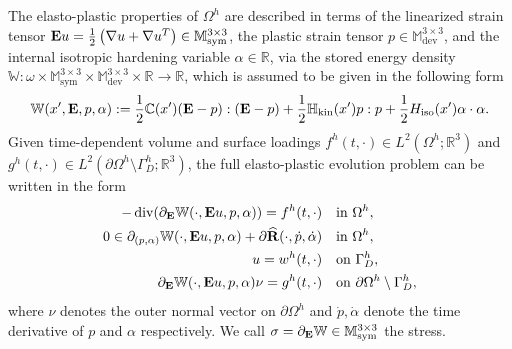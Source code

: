 \documentclass[reqno,10pt]{amsart}
\numberwithin{equation}{section}
\theoremstyle{remark}
\newcommand{\C}{\mathbb{C}}
\newcommand{\M}{\mathbb{M}}
\newcommand{\R}{\mathbb{R}}
\newcommand{\W}{{\mathbb{W}}}
\DeclareMathOperator{\dev}{dev}
\DeclareMathOperator{\sym}{sym}
\renewcommand{\div}{\operatorname{div}}
\newcommand{\fvol}{f}
\newcommand{\fsurf}{g}
\newcommand{\Dir}{D}
\newcommand{\E}{{\bf E}}
\newcommand{\Hkin}{\mathbb{H}_{\rm kin}}
\newcommand{\Hiso}{H_{\rm iso}}
\newcommand{\disspot}{\mathbf{R}}
\newcommand{\gendisspot}{\widehat{\disspot}}
\begin{document}
The elasto-plastic properties of $\Omega^h$ are described in terms of the linearized strain tensor ${\E}u = \frac{1}{2}\left(\nabla u+\nabla u^T\right) \in \M^{3 \times 3}_{\sym}$, the plastic strain tensor $p \in \M^{3 \times 3}_{\dev}$,
and the internal isotropic hardening variable $\alpha \in \R$, via the stored energy density $\W : \omega \times \M^{3 \times 3}_{\sym} \times \M^{3 \times 3}_{\dev} \times \R \to \R$, which is assumed to be given in the following form
\begin{equation} \label{stored energy density}
	\W(x', {\E}, p, \alpha) := 
	\frac{1}{2}\C(x')({\E}-p):({\E}-p) 
	+ \frac{1}{2}\Hkin(x')p:p + \frac{1}{2}\Hiso(x')\alpha\cdot\alpha.
\end{equation}
Given time-dependent volume and surface loadings $\fvol^h(t,\cdot)\in L^2(\Omega^h;\R^3)$ and $\fsurf^h(t,\cdot)\in L^2(\partial\Omega^h\setminus \Gamma_\Dir^h;\R^3)$, the full elasto-plastic evolution problem can be written in the form
\begin{equation} \label{system of elastoplastic equations on the thin plate}
\begin{split}
	-\div(\partial_{{\E}}\W(\cdot, {\E}u, p, \alpha)) = \fvol^h(t,\cdot) \quad & \text{in}\,\,\Omega^h,\\
	0 \in \partial_{(p, \alpha)}\W(\cdot, {\E}u, p, \alpha) + \partial \gendisspot(\cdot, \dot{p}, \dot{\alpha}) \quad & \text{in}\,\,\Omega^h,\\
	u = w^h(t,\cdot) \quad & \text{on}\,\, \Gamma_\Dir^h,\\
	\partial_{{\E}}\W(\cdot, {\E}u, p, \alpha) \nu = \fsurf^h(t,\cdot) \quad & \text{on}\,\,\partial\Omega^h\setminus \Gamma_\Dir^h,
\end{split}
\end{equation}
where $\nu$ denotes the outer normal vector on $\partial\Omega^h$ and $\dot{p}, \dot{\alpha}$ denote the time derivative of $p$ and $\alpha$ respectively.
We call $\sigma = \partial_{{\E}}\W \in \M^{3 \times 3}_{\sym}$ the stress.
\end{document}
